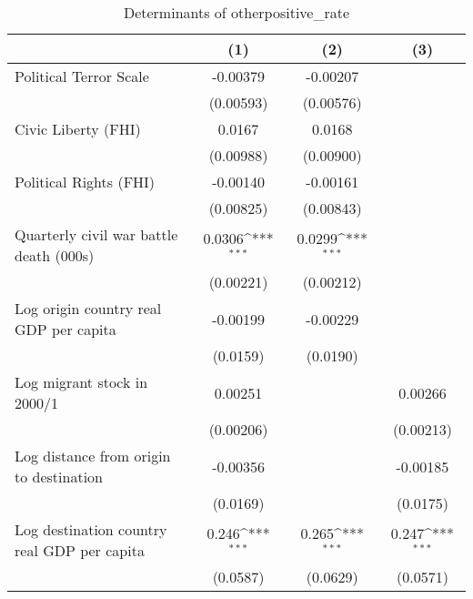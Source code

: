 \begin{table}[htbp]\centering
\def\sym#1{\ifmmode^{#1}\else\(^{#1}\)\fi}
\caption{Determinants of otherpositive\_rate}
\begin{tabular}{l*{3}{c}}
\hline\hline
                    &\multicolumn{1}{c}{(1)}         &\multicolumn{1}{c}{(2)}         &\multicolumn{1}{c}{(3)}         \\
\hline
Political Terror Scale&    -0.00379         &    -0.00207         &                     \\
                    &   (0.00593)         &   (0.00576)         &                     \\
[1em]
Civic Liberty (FHI) &      0.0167         &      0.0168         &                     \\
                    &   (0.00988)         &   (0.00900)         &                     \\
[1em]
Political Rights (FHI)&    -0.00140         &    -0.00161         &                     \\
                    &   (0.00825)         &   (0.00843)         &                     \\
[1em]
Quarterly civil war battle death (000s)&      0.0306\sym{***}&      0.0299\sym{***}&                     \\
                    &   (0.00221)         &   (0.00212)         &                     \\
[1em]
Log origin country real GDP per capita&    -0.00199         &    -0.00229         &                     \\
                    &    (0.0159)         &    (0.0190)         &                     \\
[1em]
Log migrant stock in 2000/1&     0.00251         &                     &     0.00266         \\
                    &   (0.00206)         &                     &   (0.00213)         \\
[1em]
Log distance from origin to destination&    -0.00356         &                     &    -0.00185         \\
                    &    (0.0169)         &                     &    (0.0175)         \\
[1em]
Log destination country real GDP per capita&       0.246\sym{***}&       0.265\sym{***}&       0.247\sym{***}\\
                    &    (0.0587)         &    (0.0629)         &    (0.0571)         \\

\end{tabular}
\end{table}
